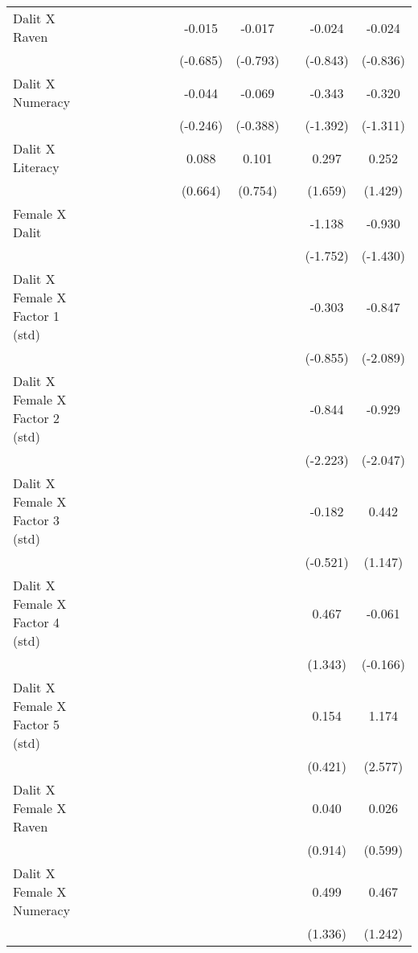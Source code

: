 {\begin{longtable}{@{\extracolsep{\fill}}lccccccccccc}
    Dalit X Raven &   &   &   &   &   &   & -0.015 & -0.017 &   & -0.024 & -0.024 \\
      &   &   &   &   &   &   & (-0.685) & (-0.793) &   & (-0.843) & (-0.836) \\
    Dalit X Numeracy &   &   &   &   &   &   & -0.044 & -0.069 &   & -0.343 & -0.320 \\
      &   &   &   &   &   &   & (-0.246) & (-0.388) &   & (-1.392) & (-1.311) \\
    Dalit X Literacy &   &   &   &   &   &   & 0.088 & 0.101 &   & 0.297 & 0.252 \\
      &   &   &   &   &   &   & (0.664) & (0.754) &   & (1.659) & (1.429) \\
    Female X Dalit &   &   &   &   &   &   &   &   &   & -1.138 & -0.930 \\
      &   &   &   &   &   &   &   &   &   & (-1.752) & (-1.430) \\
    Dalit X Female X Factor 1 (std) &   &   &   &   &   &   &   &   &   & -0.303 & -0.847 \\
      &   &   &   &   &   &   &   &   &   & (-0.855) & (-2.089) \\
    Dalit X Female X Factor 2 (std) &   &   &   &   &   &   &   &   &   & -0.844 & -0.929 \\
      &   &   &   &   &   &   &   &   &   & (-2.223) & (-2.047) \\
    Dalit X Female X Factor 3 (std) &   &   &   &   &   &   &   &   &   & -0.182 & 0.442 \\
      &   &   &   &   &   &   &   &   &   & (-0.521) & (1.147) \\
    Dalit X Female X Factor 4 (std) &   &   &   &   &   &   &   &   &   & 0.467 & -0.061 \\
      &   &   &   &   &   &   &   &   &   & (1.343) & (-0.166) \\
    Dalit X Female X Factor 5 (std) &   &   &   &   &   &   &   &   &   & 0.154 & 1.174 \\
      &   &   &   &   &   &   &   &   &   & (0.421) & (2.577) \\
    Dalit X Female X Raven &   &   &   &   &   &   &   &   &   & 0.040 & 0.026 \\
      &   &   &   &   &   &   &   &   &   & (0.914) & (0.599) \\
    Dalit X Female X Numeracy &   &   &   &   &   &   &   &   &   & 0.499 & 0.467 \\
      &   &   &   &   &   &   &   &   &   & (1.336) & (1.242) \\

\end{longtable}}
